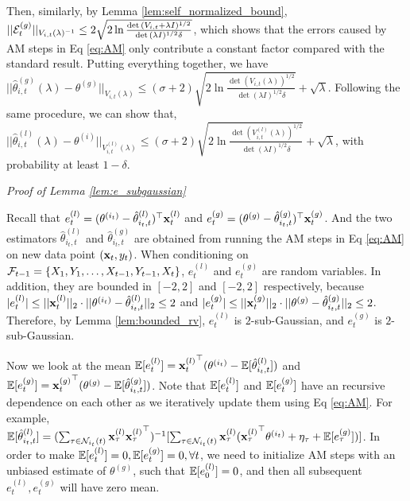 Then, similarly,  by Lemma \ref{lem:self_normalized_bound}, $||\mathcal{E}^{(g)}_{t}||_{V_{i,t}(\lambda)^{-1}} \leq 2 \sqrt{2\ln{\frac{\det{(V_{i,t}+\lambda I)^{1/2}}}{\det{(\lambda I)^{1/2}}\delta}}}$, which shows that the errors caused by AM steps in Eq \eqref{eq:AM} only contribute a constant factor compared with the standard result. Putting everything together, we have $||\hat{\theta}^{(g)}_{i,t}(\lambda) - \theta^{(g)}||_{V_{i,t}(\lambda)} \leq (\sigma+2) \sqrt{2\ln{\frac{\det{(V_{i,t}(\lambda) )^{1/2}}}{\det{(\lambda I)^{1/2}}\delta}}}+\sqrt{\lambda}$. Following the same procedure, we can show that, $||\hat{\theta}^{(l)}_{i,t}(\lambda) - \theta^{(i)}||_{V^{(l)}_{i,t}(\lambda)} \leq (\sigma+2) \sqrt{2\ln{\frac{\det{(V^{(l)}_{i,t}(\lambda))^{1/2}}}{\det{(\lambda I)^{1/2}}\delta}}}+\sqrt{\lambda}$, with probability at least $1-\delta$.

\noindent \textit{Proof of Lemma \ref{lem:e_subgaussian}}

Recall that $e^{(l)}_{t}=(\theta^{(i_{t})}-\hat{\theta}^{(l)}_{i_{t},t})^{\top}{\mathbf{x}_{t}^{(l)}}$ and $e^{(g)}_{t}=(\theta^{(g)}-\hat{\theta}^{(g)}_{i_{t},t})^{\top}{\mathbf{x}_{t}^{(g)}}$. And the two estimators $\hat{\theta}^{(l)}_{i_{t},t}$ and $\hat{\theta}^{(g)}_{i_{t},t}$ are obtained from running the AM steps in Eq \eqref{eq:AM} on new data point $(\mathbf{x}_{t},y_{t})$. When conditioning on $\mathcal{F}_{t-1}=\{X_{1},Y_{1},\dots,X_{t-1},Y_{t-1},X_{t}\}$, $e^{(l)}_{t}$ and $e^{(g)}_{t}$ are random variables. In addition, they are bounded in $[ -2, 2 ]$ and $[-2, 2]$ respectively, because $|e^{(l)}_{t}| \leq ||\mathbf{x}_{t}^{(l)}||_{2} \cdot ||\theta^{(i_{t})}-\hat{\theta}^{(l)}_{i_{t},t}||_{2} \leq 2 $ and $|e^{(g)}_{t}| \leq ||\mathbf{x}_{t}^{(g)}||_{2} \cdot ||\theta^{(g)}-\hat{\theta}^{(g)}_{i_{t},t}||_{2} \leq 2 $. Therefore, by Lemma \ref{lem:bounded_rv}, $e^{(l)}_{t}$ is $2 $-sub-Gaussian, and $e^{(g)}_{t}$ is $2$-sub-Gaussian.

Now we look at the mean $\mathbb{E}[e^{(l)}_{t}]={\mathbf{x}_{t}^{(l)}}^{\top}(\theta^{(i_{t})}-\mathbb{E}[\hat{\theta}^{(l)}_{i_{t},t}])$ and $\mathbb{E}[e^{(g)}_{t}]={\mathbf{x}_{t}^{(g)}}^{\top}(\theta^{(g)}-\mathbb{E}[\hat{\theta}^{(g)}_{i_{t},t}])$. Note that $\mathbb{E}[e^{(l)}_{t}]$ and $\mathbb{E}[e^{(g)}_{t}]$ have an recursive dependence on each other as we iteratively update them using Eq \eqref{eq:AM}. For example,
$\mathbb{E}[\hat{\theta}^{(l)}_{i_{t},t}]=(\sum_{\tau\in\mathcal{N}_{i_{t}}(t)}\mathbf{x}_{\tau}^{(l)}{\mathbf{x}_{\tau}^{(l)}}^{\top})^{-1}[\sum_{\tau\in \mathcal{N}_{i_{t}}(t)}\mathbf{x}_{\tau}^{(l)}({\mathbf{x}_{\tau}^{(l)}}^{\top}\theta^{(i_{t})}+\eta_{\tau}+\mathbb{E}[e^{(g)}_{\tau}])]$. In order to make $\mathbb{E}[e^{(l)}_{t}]=0,\mathbb{E}[e^{(g)}_{t}]=0,\forall t$, we need to initialize AM steps with an unbiased estimate of $\theta^{(g)}$, such that $\mathbb{E}[e^{(l)}_{0}]=0$, and then all subsequent $e^{(l)}_{t},e^{(g)}_{t}$ will have zero mean.

